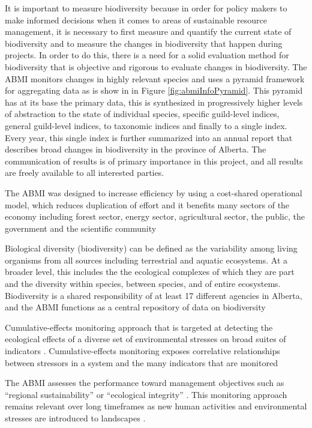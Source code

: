 \documentclass[12pt,oneside]{book}
\begin{document}
It is important to measure biodiversity because in order for policy
makers to make informed decisions when it comes to areas of
sustainable resource management, it is necessary to first measure and
quantify the current state of biodiversity and to measure the changes
in biodiversity that happen during projects.  In order to do this,
there is a need for a solid evaluation method for biodiversity that is
objective and rigorous to evaluate changes in biodiversity. The ABMI
monitors changes in highly relevant species and uses a pyramid
framework for aggregating data as is show in in Figure
\ref{fig:abmiInfoPyramid}.  This pyramid has at its base the primary
data, this is synthesized in progressively higher levels of abstraction
to the state of individual species, specific guild-level indices,
general guild-level indices, to taxonomic indices and finally to a
single index.  Every year, this single index is further summarized
into an annual report that describes broad changes in biodiversity in
the province of Alberta.  The communication of results is of primary
importance in this project, and all results are freely available to
all interested parties.

The ABMI was designed to increase efficiency by using a cost-shared
operational model, which reduces duplication of effort and it benefits
many sectors of the economy including forest sector, energy sector,
agricultural sector, the public, the government and the scientific
community

Biological diversity (biodiversity) can be defined as the variability
among living organisms from all sources including terrestrial and
aquatic ecosystems.  At a broader level, this includes the the
ecological complexes of which they are part and the diversity within
species, between species, and of entire ecosystems.  Biodiversity is a
shared responsibility of at least 17 different agencies in Alberta,
and the ABMI functions as a central repository of data on biodiversity

Cumulative-effects monitoring approach that is targeted at detecting
the ecological effects of a diverse set of environmental stresses on
broad suites of indicators
\cite{manley2004evaluation}. Cumulative-effects monitoring exposes
correlative relationships between stressors in a system and the many
indicators that are monitored \cite{thornton1994environmental}

The ABMI assesses the performance toward management objectives such as
``regional sustainability'' or ``ecological integrity''
\cite{mulder1999strategy}. This monitoring approach remains relevant
over long timeframes as new human activities and environmental
stresses are introduced to landscapes \cite{watson2004biodiversity}.
\end{document}
